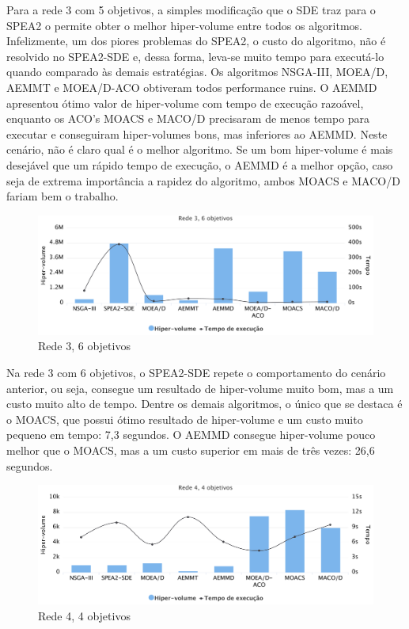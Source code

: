 Para a rede 3 com 5 objetivos, a simples modificação que o SDE traz para o SPEA2 o permite obter o melhor hiper-volume entre todos os algoritmos. Infelizmente, um dos piores problemas do SPEA2, o custo do algoritmo, não é resolvido no SPEA2-SDE e, dessa forma, leva-se muito tempo para executá-lo quando comparado às demais estratégias. Os algoritmos NSGA-III, MOEA/D, AEMMT e MOEA/D-ACO obtiveram todos performance ruins. O AEMMD apresentou ótimo valor de hiper-volume com tempo de execução razoável, enquanto os ACO's MOACS e MACO/D precisaram de menos tempo para executar e conseguiram hiper-volumes bons, mas inferiores ao AEMMD. Neste cenário, não é claro qual é o melhor algoritmo. Se um bom hiper-volume é mais desejável que um rápido tempo de execução, o AEMMD é a melhor opção, caso seja de extrema importância a rapidez do algoritmo, ambos MOACS e MACO/D fariam bem o trabalho.

\begin{figure}[!htbp]
	\caption{Rede 3, 6 objetivos}
	\label{fig_exp4_r3o6}
	\includegraphics[width=1\textwidth]{cap_experimentos/figs/etapa4/r3o6}
\end{figure}

Na rede 3 com 6 objetivos, o SPEA2-SDE repete o comportamento do cenário anterior, ou seja, consegue um resultado de hiper-volume muito bom, mas a um custo muito alto de tempo. Dentre os demais algoritmos, o único que se destaca é o MOACS, que possui ótimo resultado de hiper-volume e um custo muito pequeno em tempo: 7,3 segundos. O AEMMD consegue hiper-volume pouco melhor que o MOACS, mas a um custo superior em mais de três vezes: 26,6 segundos.

\begin{figure}[!htbp]
	\caption{Rede 4, 4 objetivos}
	\label{fig_exp4_r4o4}
	\includegraphics[width=1\textwidth]{cap_experimentos/figs/etapa4/r4o4}
\end{figure}

